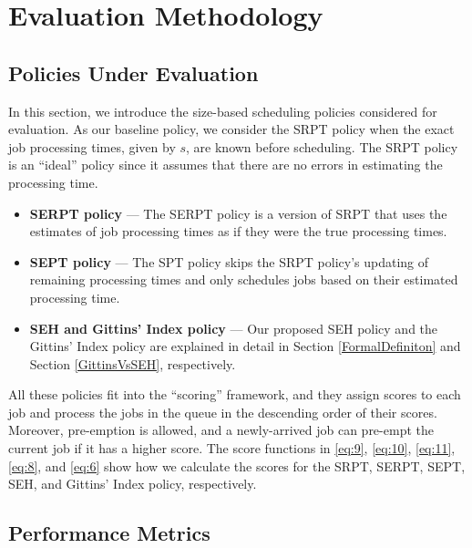\section{Evaluation Methodology} \label{EvaluationMethodology}
\subsection{Policies Under Evaluation} \label{PoliciesUnderEvaluation}

In this section, we introduce the size-based scheduling policies considered for
evaluation. As our baseline policy, we consider the SRPT policy when the exact
job processing times, given by $s$, are known before scheduling. The SRPT policy is an ``ideal'' policy since it assumes that there are no errors in estimating the processing time. 
\begin{itemize}

\item \textbf{SERPT policy} --- The SERPT policy is a version of SRPT that uses the estimates of job processing times as if they were the true processing times.




\item \textbf{SEPT policy} --- The SPT policy skips the SRPT policy's updating of remaining processing times and only schedules jobs based on their estimated processing time. 

\item \textbf{SEH and Gittins' Index policy} --- Our proposed SEH policy and the Gittins' Index policy are explained in detail in Section \ref{FormalDefiniton} and Section \ref{GittinsVsSEH}, respectively. 
\end{itemize}

All these policies fit into the ``scoring'' framework, and they assign scores to each job
and process the jobs in the queue in the descending order of their scores.
Moreover, pre-emption is allowed, and a newly-arrived job can pre-empt the
current job if it has a higher score. The score functions in  \eqref{eq:9},  \eqref{eq:10}, \eqref{eq:11}, \eqref{eq:8}, and \eqref{eq:6} show how we
calculate the scores for the SRPT, SERPT, SEPT, SEH, and Gittins' Index policy,
respectively. 

\subsection{Performance Metrics} \label{PerformanceMetrics}

